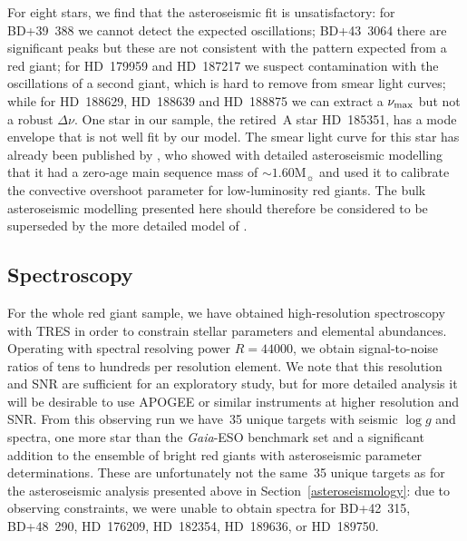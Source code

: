 \documentclass[a4paper,fleqn,usenatbib]{mnras}
\newcommand{\numax}{\mbox{$\nu_{\rm max}$}\xspace}
\newcommand{\Dnu}{\mbox{$\Delta \nu$}\xspace}
\newcommand{\logg}{\mbox{$\log g$}\xspace}
\newcommand{\msun}{\mbox{$\mathrm{M}_{\sun}$}\xspace}
\newcommand{\gaia}{\emph{Gaia}\xspace}
\begin{document}
For eight stars, we find that the asteroseismic fit is unsatisfactory: for BD+39~388 we cannot detect the expected oscillations; BD+43~3064 there are significant peaks but these are not consistent with the pattern expected from a red giant; for HD~179959 and HD~187217 we suspect contamination with the oscillations of a second giant, which is hard to remove from smear light curves; while for HD~188629, HD~188639 and HD~188875 we can extract a \numax but not a robust \Dnu. One star in our sample, the retired~A star HD~185351, has a mode envelope that is not well fit by our model. The smear light curve for this star has already been published by \citet{2017MNRAS.464.3713H}, who showed with detailed asteroseismic modelling that it had a zero-age main sequence mass of $\sim 1.60 \msun$ and used it to calibrate the convective overshoot parameter for low-luminosity red giants. The bulk asteroseismic modelling presented here should therefore be considered to be superseded by the more detailed model of \citet{2017MNRAS.464.3713H}. 



\subsection{Spectroscopy}
\label{spectroscopy}

For the whole red giant sample, we have obtained high-resolution spectroscopy with TRES in order to constrain stellar parameters and elemental abundances. Operating with spectral resolving power $R=44 000$, we obtain signal-to-noise ratios of tens to hundreds per resolution element. We note that this resolution and SNR are sufficient for an exploratory study, but for more detailed analysis it will be desirable to use APOGEE or similar instruments at higher resolution and SNR. From this observing run we have~35 unique targets with seismic \logg and spectra, one more star than the \gaia-ESO benchmark set and a significant addition to the ensemble of bright red giants with asteroseismic parameter determinations. These are unfortunately not the same~35 unique targets as for the asteroseismic analysis presented above in Section~\ref{asteroseismology}: due to observing constraints, we were unable to obtain spectra for BD+42~315, BD+48~290, HD~176209, HD~182354, HD~189636, or HD~189750.
\end{document}
